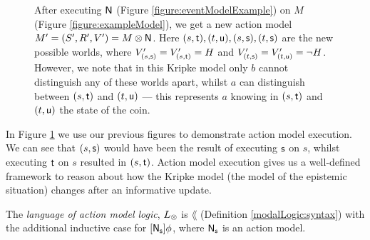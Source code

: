 \begin{figure}
\centering
{}
\caption[Kripke model after action model execution]{After executing $\mathrm{\mathsf{N}}$ (Figure \ref{figure:eventModelExample}) on $M$ (Figure
\ref{figure:exampleModel}), we get a new action model $M' = (S',R',V') = M \otimes \mathrm{\mathsf{N}}$.
Here $(s, \mathrm{\mathsf{t}}), (t, \mathrm{\mathsf{u}}), (s, \mathrm{\mathsf{s}}), (t, \mathrm{\mathsf{s}})$ are the new possible worlds, where $V'_{(s, \mathrm{\mathsf{s}})}
= V'_{(s, \mathrm{\mathsf{t}})} = H$ and $V'_{(t, \mathrm{\mathsf{s}})} = V'_{(t, \mathrm{\mathsf{u}})} = \neg H$.
However, we note that in this Kripke model only $b$ cannot distinguish any of these worlds apart, whilst
$a$ can distinguish between $(s, \mathrm{\mathsf{t}})$ and $(t, \mathrm{\mathsf{u}})$ --- this represents $a$ knowing in $(s,
\mathrm{\mathsf{t}})$ and $(t, \mathrm{\mathsf{u}})$ the state
of the coin.}
\label{figure:eventModelPostExecution}
\end{figure}

In Figure \ref{figure:eventModelPostExecution} we use our previous figures to
demonstrate action model execution.
We can see that $(s, \mathrm{\mathsf{s}})$ would have been the result of executing $\mathrm{\mathsf{s}}$ on $s$, whilst executing
$\mathrm{\mathsf{t}}$ on $s$ resulted in $(s, \mathrm{\mathsf{t}})$.
Action model execution gives us a well-defined framework to reason about how the Kripke model
(the model of the epistemic situation) changes after an informative update.

\begin{defn} \label{actModelLogic:syntax}
	The {\em language of action model logic}, $L_{\otimes}$ is $\lang$ (Definition
	\ref{modalLogic:syntax}) with the additional inductive case for $[{\mathrm{\mathsf{N}}_\mathrm{\mathsf{s}}}]\phi$, where
	$\mathrm{\mathsf{N}}_\mathrm{\mathsf{s}}$ is an action model.
\end{defn}

